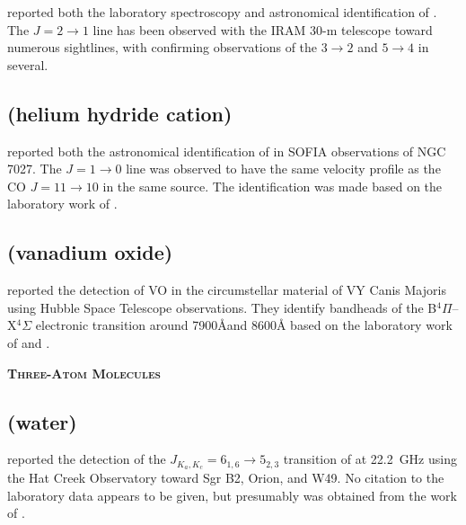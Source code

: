 \documentclass[twocolumn]{aastex631}
\newcommand{\update}[1]{{#1}}
\begin{document}
    \citet{Cernicharo:2018bv} reported both the laboratory spectroscopy and astronomical identification of .  The $J = 2\rightarrow1$ line has been observed with the IRAM 30-m telescope toward numerous sightlines, with confirming observations of the $3\rightarrow2$ and $5\rightarrow4$ in several.  
    
    \subsection{\update{ (helium hydride cation)}}
    \label{HeH+}
    
    \update{\citet{Gusten:2019cj} reported both the astronomical identification of \ce{HeH^+} in SOFIA observations of NGC 7027.  The $J = 1\rightarrow0$ line was observed to have the same velocity profile as the CO $J = 11\rightarrow10$ in the same source.  The identification was made based on the laboratory work of \citet{Perry:2014cj}.} 
    
    \subsection{\update{ (vanadium oxide)}}
    \label{VO}
    
    \update{\citet{Humphreys:2019kb} reported the detection of VO in the circumstellar material of VY Canis Majoris using Hubble Space Telescope observations.  They identify bandheads of the B$^4\Pi$--X$^4\Sigma$ electronic transition around 7900\AA {and 8600\AA} based on the laboratory work of \citet{Cheung:1994td} and \citet{Adam:1995tq}.}
    
    
    \begin{center}
        \large
        \textsc{\textbf{Three-Atom Molecules}}
        \label{3atoms}
        \normalsize
    \end{center}        
    
    \subsection{ (water)}
    \label{H2O}
    
    \citet{Cheung:1969mh} reported the detection of the $J_{K_a,K_c} = 6_{1,6}\rightarrow5_{2,3}$ transition of  at 22.2~GHz using the Hat Creek Observatory toward Sgr B2, Orion, and W49.  No citation to the laboratory data appears to be given, but presumably was obtained from the work of \citet{Golden:1948jh}.
    
\end{document}
